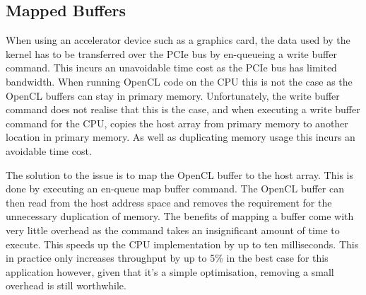 \subsection{Mapped Buffers}
\label{sec:mappedBuffers}

When using an accelerator device such as a graphics card, the data used by the
kernel has to be transferred over the PCIe bus by en-queueing a write buffer
command. This incurs an unavoidable time cost as the PCIe bus has limited
bandwidth. When running OpenCL code on the CPU this is not the case as the
OpenCL buffers can stay in primary memory. Unfortunately, the write buffer
command does not realise that this is the case, and when executing a write
buffer command for the CPU, copies the host array from primary memory to another
location in primary memory. As well as duplicating memory usage this incurs an
avoidable time cost.

The solution to the issue is to map the OpenCL buffer to the host array. This is
done by executing an en-queue map buffer command. The OpenCL buffer can then
read from the host address space and removes the requirement for the unnecessary
duplication of memory. The benefits of mapping a buffer come with very little
overhead as the command takes an insignificant amount of time to execute. This
speeds up the CPU implementation by up to ten milliseconds. This in practice
only increases throughput by up to 5\% in the best case for this application
however, given that it's a simple optimisation, removing a small overhead is
still worthwhile.
